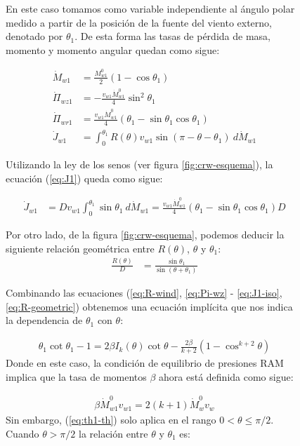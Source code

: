 \begin{figure}
En este caso tomamos como variable independiente al ángulo polar medido a partir de la posición de la fuente del viento externo, denotado por $\theta_1$. De esta forma las tasas de pérdida de masa, momento y momento angular quedan como sigue:

\begin{align}
  \dot{M}_{w1} &= \frac{M^0_{w1}}{2}\left(1 - \cos\theta_1\right)\\
  \dot{\Pi}_{wz1} &= -\frac{v_{w1}\dot{M}^0_{w1}}{4}\sin^2\theta_1\\
  \dot{\Pi}_{wr1} &= \frac{v_{w1}\dot{M}^0_{w1}}{4}\left(\theta_1 - \sin\theta_1\cos\theta_1\right)\\
  \dot{J}_{w1} &= \int^{\theta_1}_0 R(\theta)v_{w1}\sin(\pi-\theta-\theta_1)~d\dot{M}_{w1} \label{eq:J1}
\end{align}

Utilizando la ley de los senos (ver figura \ref{fig:crw-esquema}), la ecuación (\ref{eq:J1}) queda como sigue:

\begin{align}
  \dot{J}_{w1} &= Dv_{w1}\int^{\theta_1}_0 \sin\theta_1~d\dot{M}_{w1} =
                 \frac{v_{w1}\dot{M}^0_{w1}}{4}\left(\theta_1 - \sin\theta_1\cos\theta_1\right) D \label{eq:J1-iso}
\end{align}

Por otro lado, de la figura \ref{fig:crw-esquema}, podemos deducir la siguiente relación geométrica entre $R(\theta)$,
$\theta$ y $\theta_1$:
\begin{align}
  \frac{R(\theta)}{D} &= \frac{\sin\theta_1}{\sin(\theta+\theta_1)} \label{eq:R-geometric}
\end{align}

Combinando las ecuaciones (\ref{eq:R-wind}, \ref{eq:Pi-wz} - \ref{eq:J1-iso}, \ref{eq:R-geometric}) obtenemos una ecuación implícita que nos indica la dependencia de $\theta_1$ con $\theta$:

\begin{align}
  \theta_1\cot\theta_1 -1 = 2\beta I_k(\theta)\cot\theta - \frac{2\beta}{k+2}\left(1 - \cos^{k+2}\theta\right) \label{eq:th1-th} 
\end{align}
Donde en este caso, la condición de equilibrio de presiones RAM implica que la tasa de momentos $\beta$ ahora está definida como sigue:

\begin{align}
  \beta\dot{M}^0_{w1}v_{w1} = 2(k+1) \dot{M}^0_{w}v_{w}
\end{align}
Sin embargo, (\ref{eq:th1-th}) solo aplica en el rango $0 < \theta \leq \pi/2$. Cuando $\theta > \pi/2$ la relación entre $\theta$ y $\theta_1$ es:


\end{figure}
